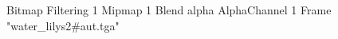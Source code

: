 {Bitmap
	{Filtering 1}
	{Mipmap 1}
	{Blend alpha}
	{AlphaChannel 1}
	{Frame "water_lilys2#aut.tga"}
}
